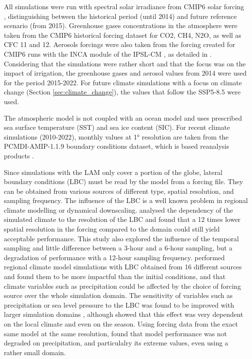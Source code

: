 All simulations were run with spectral solar irradiance from CMIP6 solar forcing \citep{matthes_solar_2017}, distinguishing between the historical period (until 2014) and future reference scenario (from 2015).
Greenhouse gases concentrations in the atmosphere were taken from the CMIP6 historical forcing dataset for CO2, CH4, N2O, as well as CFC 11 and 12.
Aerosols forcings were also taken from the forcing created for CMIP6 runs with the INCA module of the IPSL-CM \citep{hauglustaine_global_2014}, as detailed in \citet{lurton_implementation_2020}.
Considering that the simulations were rather short and that the focus was on the impact of irrigation, the greenhouse gases and aerosol values from 2014 were used for the period 2015-2022. For future climate simulations with a focus on climate change (Section \ref{sec:climate_change}), the values that follow the SSP5-8.5 were used.

The atmospheric model is not coupled with an ocean model and uses prescribed sea surface temperature (SST) and sea ice content (SIC). For recent climate simulations (2010-2022), monthly values at 1° resolution are taken from the PCMDI-AMIP-1.1.9 boundary conditions dataset, which is based reanalysis products \citep{taylor_sea_2000, hurrell_new_2008}.

\hfill

Since simulations with the LAM only cover a portion of the globe, lateral boundary conditions (LBC) must be read by the model from a forcing file. They can be obtained from various sources of different type, spatial resolution, and sampling frequency. 
The influence of the LBC is a well known problem in regional climate modelling or dynamical downscaling. 
\citet{denis_sensitivity_2003} analysed the dependency of the simulated climate to the resolution of the LBC and found that a 12 times lower spatial resolution in the forcing compared to the domain could still yield acceptable performance. This study also explored the influence of the temporal sampling and little difference between a 3-hour and a 6-hour sampling, but a degradation of performance with a 12-hour sampling frequency.
\citet{wu_estimating_2005} performed regional climate model simulations with LBC obtained from 16 different sources and found them to be more impactful than the initial conditions, and that climate variables such as precipitation could be affected by the choice of forcing source over the whole simulation domain. 
The sensitivity of variables such as precipitation or sea level pressure to the LBC was found to be improved with larger simulation domains \citep{koltzow_importance_2011}, although \citet{leduc_sensitivity_2011} showed that this effect was very dependent on the local climate and even on the season.
Using forcing data from the exact same model at the same resolution, \citet{colin_sensitivity_2010} found that model performance was not degraded on precipitation, and particulalry its extreme values, even using a rather small domain. 

